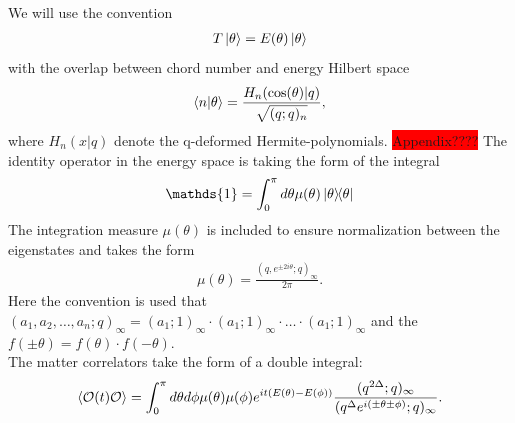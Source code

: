 \documentclass[11pt,a4paper]{article}
\begin{document}
We will use the convention
\begin{align}
    T \ket{\theta} = E(\theta) \ket{\theta}
\end{align}
with the overlap between chord number and energy Hilbert space
\begin{align}
    \braket{n}{\theta} = \frac{H_{n}(\cos(\theta)|q)}{\sqrt{(q;q)_{n}}},
\end{align}
where $H_n(x|q)$ denote the q-deformed Hermite-polynomials. \colorbox{red}{Appendix????}
The identity operator in the energy space is taking the form of the integral
\begin{align}
    \mathds{1} = \int_{0}^{\pi} d\theta \mu(\theta) \ketbra{\theta}
\end{align}
The integration measure $\mu(\theta)$ is included to ensure normalization between the eigenstates and takes the form
\begin{align}
    \mu(\theta) = \frac{(q, e^{\pm 2 i \theta};q)_\infty}{2\pi}.
\end{align}
Here the convention is used that $(a_1, a_2, \dots, a_n;q)_\infty = (a_1; 1)_\infty \cdot (a_1; 1)_\infty\cdot \dotsc \cdot (a_1; 1)_\infty $ and the $f(\pm \theta)= f(\theta) \cdot f(-\theta)$. \\
The matter correlators take the form of a double integral:
\begin{align}
    \ev{\mathcal{O}(t) \mathcal{O}} = \int_0^\pi d\theta d\phi \mu(\theta) \mu(\phi) e^{it(E(\theta)-E(\phi))} \frac{(q^{2 \Delta};q)_{\infty}}{(q^{\Delta} e^{i(\pm \theta \pm \phi)};q)_\infty}.
    \label{eq:DSSYK_2pt_fct}
\end{align}

\end{document}
